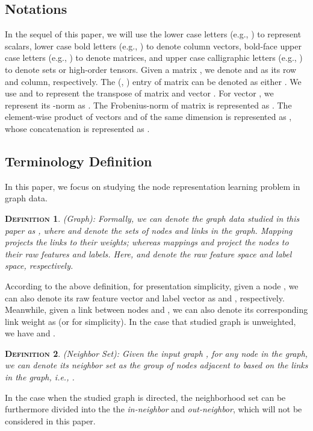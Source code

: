 \documentclass{article}
\newtheorem{definition}{\textsc{Definition}}
\begin{document}
\subsection{Notations}\label{subsec:notation}

In the sequel of this paper, we will use the lower case letters (e.g., ) to represent scalars, lower case bold letters (e.g., ) to denote column vectors, bold-face upper case letters (e.g., ) to denote matrices, and upper case calligraphic letters (e.g., ) to denote sets or high-order tensors. Given a matrix , we denote  and  as its  row and  column, respectively. The (, ) entry of matrix  can be denoted as either . We use  and  to represent the transpose of matrix  and vector . For vector , we represent its -norm as . The Frobenius-norm of matrix  is represented as . The element-wise product of vectors  and  of the same dimension is represented as , whose concatenation is represented as .


\subsection{Terminology Definition}

In this paper, we focus on studying the node representation learning problem in graph data.

\begin{definition}
(Graph): Formally, we can denote the graph data studied in this paper as , where  and  denote the sets of nodes and links in the graph. Mapping  projects the links to their weights; whereas mappings  and  project the nodes to their raw features and labels. Here,  and  denote the raw feature space and label space, respectively.
\end{definition}

According to the above definition, for presentation simplicity, given a node , we can also denote its raw feature vector and label vector as  and , respectively. Meanwhile, given a link  between nodes  and , we can also denote its corresponding link weight as  (or  for simplicity). In the case that studied graph is unweighted, we have  and .

\begin{definition}
(Neighbor Set): Given the input graph , for any node  in the graph, we can denote its neighbor set as the group of nodes adjacent to  based on the links in the graph, i.e., .
\end{definition}

In the case when the studied graph is directed, the neighborhood set can be furthermore divided into the the \textit{in-neighbor} and \textit{out-neighbor}, which will not be considered in this paper.
\end{document}

